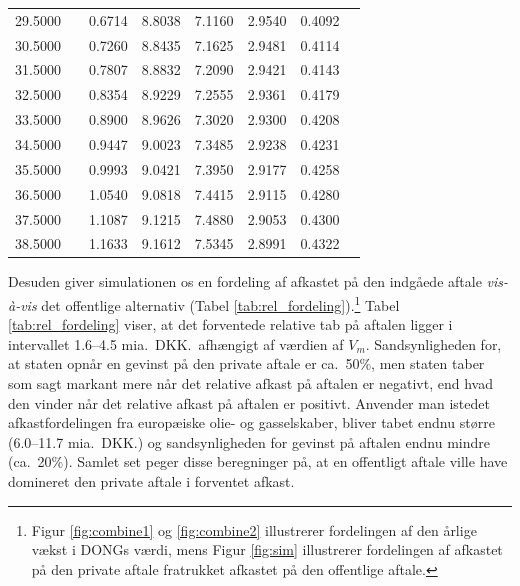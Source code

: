 \documentclass{article}
\begin{document}
\begin{table}[h]
\begin{tabularx}{0.95\linewidth}{cXcccccr}
 29.5000&&0.6714&8.8038&7.1160&2.9540&0.4092\\
 30.5000&&0.7260&8.8435&7.1625&2.9481&0.4114\\
 31.5000&&0.7807&8.8832&7.2090&2.9421&0.4143\\
 32.5000&&0.8354&8.9229&7.2555&2.9361&0.4179\\
 33.5000&&0.8900&8.9626&7.3020&2.9300&0.4208\\
 34.5000&&0.9447&9.0023&7.3485&2.9238&0.4231\\
 35.5000&&0.9993&9.0421&7.3950&2.9177&0.4258\\
 36.5000&&1.0540&9.0818&7.4415&2.9115&0.4280\\
 37.5000&&1.1087&9.1215&7.4880&2.9053&0.4300\\
 38.5000&&1.1633&9.1612&7.5345&2.8991&0.4322\\

\bottomrule[1pt]
	\end{tabularx}
	\begin{minipage}{\linewidth}
	\end{minipage}
\end{table}

Desuden giver simulationen os en fordeling af afkastet på den indgåede aftale \emph{vis-\`{a}-vis} det offentlige alternativ (Tabel \ref{tab:rel_fordeling}).\footnote{Figur \ref{fig:combine1} og \ref{fig:combine2} illustrerer fordelingen af den årlige vækst i DONGs værdi, mens Figur \ref{fig:sim} illustrerer fordelingen af afkastet på den private aftale fratrukket afkastet på den offentlige aftale.} Tabel \ref{tab:rel_fordeling} viser, at det forventede relative tab på aftalen ligger i intervallet 1.6--4.5 mia.\ DKK.\ afhængigt af værdien af $V_m$. Sandsynligheden for, at staten opnår en gevinst på den private aftale er ca.\ 50\%, men staten taber som sagt markant mere når det relative afkast på aftalen er negativt, end hvad den vinder når det relative afkast på aftalen er positivt. Anvender man istedet afkastfordelingen fra europæiske olie- og gasselskaber, bliver tabet endnu større (6.0--11.7 mia.\ DKK.) og sandsynligheden for gevinst på aftalen endnu mindre (ca.\ 20\%). Samlet set peger disse beregninger på, at en offentligt aftale ville have domineret den private aftale i forventet afkast.
\end{document}
